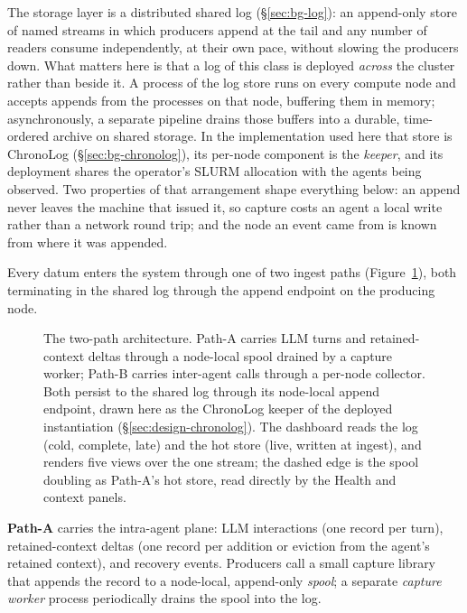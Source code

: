 The storage layer is a distributed shared log (\S\ref{sec:bg-log}): an
append-only store of named streams in which producers append at the tail and
any number of readers consume independently, at their own pace, without
slowing the producers down. What matters here is that a log of this class is
deployed \emph{across} the cluster rather than beside it. A process of the
log store runs on every compute node and accepts appends from the processes
on that node, buffering them in memory; asynchronously, a separate pipeline
drains those buffers into a durable, time-ordered archive on shared storage.
In the implementation used here that store is ChronoLog
(\S\ref{sec:bg-chronolog}), its per-node component is the \emph{keeper}, and
its deployment shares the operator's SLURM allocation with the agents being
observed. Two properties of that arrangement shape everything below: an
append never leaves the machine that issued it, so capture costs an agent a
local write rather than a network round trip; and the node an event came from
is known from where it was appended.

Every datum enters the system through one of two ingest paths
(Figure~\ref{fig:dataflow}), both terminating in the shared log through the
append endpoint on the producing node.

\begin{figure}[t]
  \centering
  \resizebox{\linewidth}{!}{}
  \caption[The two-path capture architecture]{The two-path architecture. Path-A carries LLM turns and
  retained-context deltas through a node-local spool drained by a capture
  worker; Path-B carries inter-agent calls through a per-node collector.
  Both persist to the shared log through its node-local append endpoint,
  drawn here as the ChronoLog keeper of the deployed instantiation
  (\S\ref{sec:design-chronolog}). The dashboard
  reads the log (cold, complete, late) and the hot store (live, written at
  ingest), and renders five views over the one stream; the dashed edge is
  the spool doubling as Path-A's hot store, read directly by the Health and
  context panels.}
  \label{fig:dataflow}
\end{figure}

\textbf{Path-A} carries the intra-agent plane: LLM interactions (one record
per turn), retained-context deltas (one record per addition or eviction from the
agent's retained context), and recovery events. Producers call a small
capture library that appends the record to a node-local, append-only
\emph{spool}; a separate \emph{capture worker} process periodically drains
the spool into the log.

